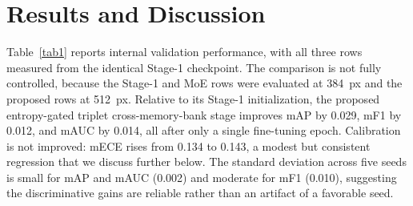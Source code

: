 \documentclass[conference]{IEEEtran}
\begin{document}
\section{Results and Discussion}
\label{sec:results}

\begin{table}[htbp]
\caption{Internal validation performance, all three rows sharing the same Stage-1 checkpoint used in our original submission~\cite{b12}. Stage-2 (proposed) is reported as mean $\pm$ sample standard deviation over 5 seeds and was produced by the original implementation (Section~\ref{sec:corrections}: pre-decoder embedding, misordered class weights). The Stage-1 and MoE rows are at 384~px, the proposed rows at 512~px.}
\begin{center}
\label{tab1}
\end{center}
\end{table}

Table~\ref{tab1} reports internal validation performance, with all three rows measured from the identical Stage-1 checkpoint. The comparison is not fully controlled, because the Stage-1 and MoE rows were evaluated at 384~px and the proposed rows at 512~px. Relative to its Stage-1 initialization, the proposed entropy-gated triplet cross-memory-bank stage improves mAP by 0.029, mF1 by 0.012, and mAUC by 0.014, all after only a single fine-tuning epoch. Calibration is not improved: mECE rises from 0.134 to 0.143, a modest but consistent regression that we discuss further below. The standard deviation across five seeds is small for mAP and mAUC (0.002) and moderate for mF1 (0.010), suggesting the discriminative gains are reliable rather than an artifact of a favorable seed.
\end{document}
